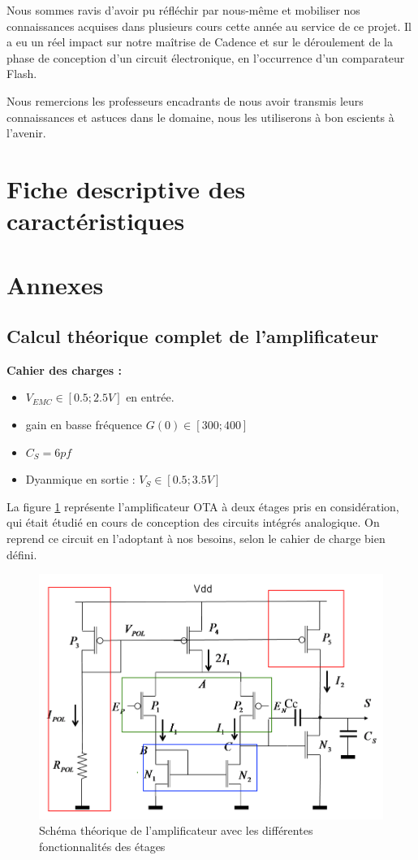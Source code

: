 \documentclass[11pt]{article}
\begin{document}
Nous sommes ravis d'avoir pu r\'efl\'echir par nous-m\^eme et mobiliser nos connaissances acquises dans plusieurs cours cette ann\'ee au service
de ce projet. Il a eu un r\'eel impact sur notre maîtrise de Cadence et sur le d\'eroulement de la phase de conception d'un circuit \'electronique,
en l'occurrence d'un comparateur Flash.

Nous remercions les professeurs encadrants de nous avoir transmis leurs connaissances et astuces dans le domaine, nous les utiliserons
\`a bon escients \`a l'avenir.

\clearpage

\section{Fiche descriptive des caract\'eristiques}

\clearpage

\section{Annexes}
\subsection{Calcul th\'eorique complet de l'amplificateur}\label{Annexe1}

\textbf{Cahier des charges :} 
\begin{itemize}\itemsep -4pt
\item $V_{EMC} \in [0.5; 2.5V]$ en entr\'ee.
\item gain en basse fr\'equence $G(0) \in [300;400]$
\item $C_{S} = 6 pf$
\item Dyanmique en sortie : $V_{S} \in [0.5; 3.5V]$ 
\end{itemize}

La figure \ref{fig:schemaAOP-OTA} repr\'esente l'amplificateur OTA \`a deux \'etages pris
en consid\'eration, qui \'etait \'etudi\'e en cours de conception des circuits int\'egr\'es analogique\cite{TD4-AOP}.
On reprend ce circuit en l'adoptant \`a nos besoins, selon le cahier de charge bien d\'efini.

\begin{figure}[!htb]
      \centering
      \includegraphics[width=0.6\linewidth]{schema_composition_AOP_2_etages.png}
      \caption{Sch\'ema th\'eorique de l'amplificateur avec les diff\'erentes fonctionnalit\'es des \'etages}
      \label{fig:schemaAOP-OTA}
\end{figure}%
\end{document}
